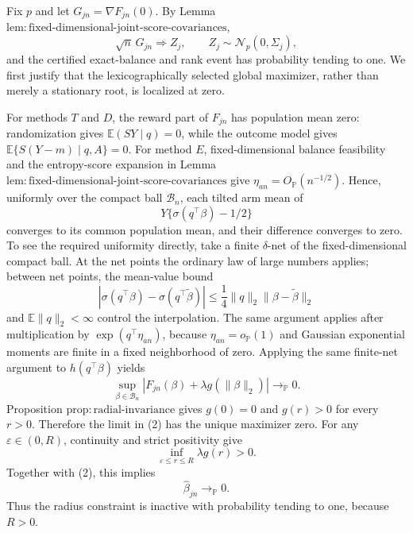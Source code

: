 Fix \(p\) and let \(G_{jn}=\nabla F_{jn}(0)\).  By Lemma \(\mathrm{lem{:}fixed\mbox{-}dimensional\mbox{-}joint\mbox{-}score\mbox{-}covariances}\),
\[
 \sqrt n\,G_{jn}\Rightarrow Z_j,
 \qquad Z_j\sim\mathcal N_p(0,\Sigma_j),
 \tag{1}
\]
and the certified exact-balance and rank event has probability tending to one.  We first justify that the lexicographically selected global maximizer, rather than merely a stationary root, is localized at zero.

For methods \(T\) and \(D\), the reward part of \(F_{jn}\) has population mean zero: randomization gives \(\mathbb E(SY\mid q)=0\), while the outcome model gives \(\mathbb E\{S(Y-m)\mid q,A\}=0\).  For method \(E\), fixed-dimensional balance feasibility and the entropy-score expansion in Lemma \(\mathrm{lem{:}fixed\mbox{-}dimensional\mbox{-}joint\mbox{-}score\mbox{-}covariances}\) give \(\eta_{an}=O_{\mathbb P}(n^{-1/2})\).  Hence, uniformly over the compact ball \(\mathcal B_n\), each tilted arm mean of
\[
 Y\{\sigma(q^\top\beta)-1/2\}
\]
converges to its common population mean, and their difference converges to zero.  To see the required uniformity directly, take a finite \(\delta\)-net of the fixed-dimensional compact ball.  At the net points the ordinary law of large numbers applies; between net points, the mean-value bound
\[
 |\sigma(q^\top\beta)-\sigma(q^\top\widetilde\beta)|
 \le \frac14\|q\|_2\|\beta-\widetilde\beta\|_2
\]
and \(\mathbb E\|q\|_2<\infty\) control the interpolation.  The same argument applies after multiplication by \(\exp(q^\top\eta_{an})\), because \(\eta_{an}=o_{\mathbb P}(1)\) and Gaussian exponential moments are finite in a fixed neighborhood of zero.  Applying the same finite-net argument to \(h(q^\top\beta)\) yields
\[
 \sup_{\beta\in\mathcal B_n}
 \left|F_{jn}(\beta)+\lambda g(\|\beta\|_2)\right|
 \longrightarrow_{\mathbb P}0.
 \tag{2}
\]
Proposition \(\mathrm{prop{:}radial\mbox{-}invariance}\) gives \(g(0)=0\) and \(g(r)>0\) for every \(r>0\).  Therefore the limit in (2) has the unique maximizer zero.  For any \(\varepsilon\in(0,R)\), continuity and strict positivity give
\[
 \inf_{\varepsilon\le r\le R}\lambda g(r)>0.
\]
Together with (2), this implies
\[
 \widehat\beta_{jn}\longrightarrow_{\mathbb P}0.
 \tag{3}
\]
Thus the radius constraint is inactive with probability tending to one, because \(R>0\).

